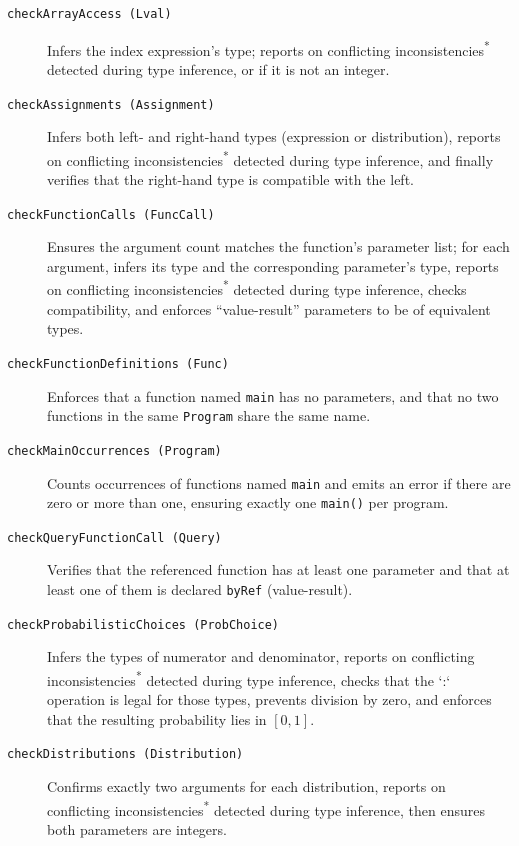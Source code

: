 \begin{description}

  \item[\texttt{checkArrayAccess (Lval)}]
    Infers the index expression’s type; reports on conflicting inconsistencies\textsuperscript{*} detected during type inference, or if it is not an integer.

  \item[\texttt{checkAssignments (Assignment)}]
    Infers both left- and right-hand types (expression or distribution), reports on conflicting inconsistencies\textsuperscript{*} detected during type inference, and finally verifies that the right-hand type is compatible with the left.

  \item[\texttt{checkFunctionCalls (FuncCall)}]
    Ensures the argument count matches the function's parameter list; for each argument, infers its type and the corresponding parameter's type, reports on conflicting inconsistencies\textsuperscript{*} detected during type inference, checks compatibility, and enforces “value-result” parameters to be of equivalent types.

  \item[\texttt{checkFunctionDefinitions (Func)}]
    Enforces that a function named \texttt{main} has no parameters, and that no two functions in the same \texttt{Program} share the same name.

  \item[\texttt{checkMainOccurrences (Program)}]
    Counts occurrences of functions named \texttt{main} and emits an error if there are zero or more than one, ensuring exactly one \texttt{main()} per program.

  \item[\texttt{checkQueryFunctionCall (Query)}]
    Verifies that the referenced function has at least one parameter and that at least one of them is declared \texttt{byRef} (value-result).

  \item[\texttt{checkProbabilisticChoices (ProbChoice)}]
    Infers the types of numerator and denominator, reports on conflicting inconsistencies\textsuperscript{*} detected during type inference, checks that the `:` operation is legal for those types, prevents division by zero, and enforces that the resulting probability lies in \([0,1]\).

  \item[\texttt{checkDistributions (Distribution)}]
    Confirms exactly two arguments for each distribution, reports on conflicting inconsistencies\textsuperscript{*} detected during type inference, then ensures both parameters are integers.


\end{description}
